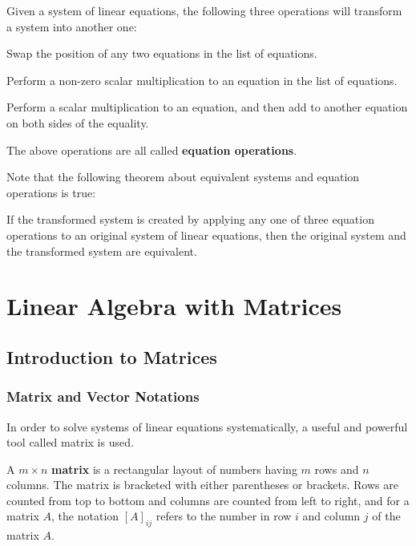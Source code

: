 \documentclass[a4paper,12pt]{article}
\begin{document}
\begin{dft}
  Given a system of linear equations, the following three operations will transform a system into another one:

  \begin{alist}
    \item Swap the position of any two equations in the list of equations.
    \item Perform a non-zero scalar multiplication to an equation in the list of equations.
    \item Perform a scalar multiplication to an equation, and then add to another equation on both sides of the equality.
  \end{alist}

  The above operations are all called \textbf{equation operations}.
\end{dft}\n

Note that the following theorem about equivalent systems and equation operations is true:\n

\begin{pst}
  If the transformed system is created by applying any one of three equation operations to an original system of linear equations, then the original system and the transformed system are equivalent.
\end{pst}

\pagebreak

\section{Linear Algebra with Matrices}
\subsection{Introduction to Matrices}
\subsubsection{Matrix and Vector Notations}
In order to solve systems of linear equations systematically, a useful and powerful tool called matrix is used.\n

\begin{dft}
  A $m\times n$ \textbf{matrix} is a rectangular layout of numbers having $m$ rows and $n$ columns. The matrix is bracketed with either parentheses or brackets. Rows are counted from top to bottom and columns are counted from left to right, and for a matrix $A$, the notation $[A]_{ij}$ refers to the number in row $i$ and column $j$ of the matrix $A$.
\end{dft}\n
\end{document}
